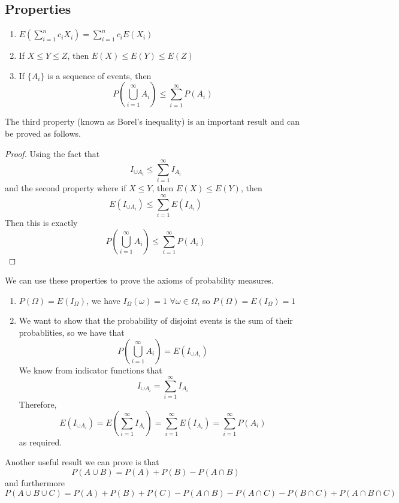 \subsection{Properties}
\begin{enumerate}
    \item $E\left(\sum\limits_{i=1}^n c_iX_i\right) = \sum\limits_{i=1}^n c_iE(X_i)$
    \item If $X \leq Y \leq Z$, then $E(X) \leq E(Y) \leq E(Z)$
    \item If $\{A_i\}$ is a sequence of events, then 
    \[P\left(\bigcup_{i=1}^\infty A_i\right) \leq \sum_{i=1}^\infty P(A_i)\]
   
\end{enumerate}
The third property (known as Borel's inequality) is an important result and can be proved as follows. 
\begin{proof}
    Using the fact that 
    \[I_{\cup A_i} \leq \sum_{i=1}^\infty I_{A_i}\]
    and the second property where if $X \leq Y$, then $E(X) \leq E(Y)$, then 
    \[E\left(I_{\cup A_i}\right) \leq \sum_{i=1}^\infty E(I_{A_i})\]
    Then this is exactly 
    \[P\left(\bigcup_{i=1}^\infty A_i\right) \leq \sum_{i=1}^\infty P(A_i)\]
\end{proof}
\noindent
We can use these properties to prove the axioms of probability measures. 
\begin{enumerate}
    \item $P(\Omega) = E(I_\Omega)$, we have $I_\Omega(\omega) = 1$ $\forall \omega \in \Omega$, so $P(\Omega) = E(I_\Omega) = 1$
    \item We want to show that the probability of disjoint events is the sum of their probablities, so we have that 
    \[P\left(\bigcup_{i=1}^\infty A_i\right) = E\left(I_{\cup A_i}\right)\]
    We know from indicator functions that 
    \[I_{\cup A_i} = \sum_{i=1}^\infty I_{A_i}\]
    Therefore,
    \[E\left(I_{\cup A_i}\right) = E\left(\sum_{i=1}^\infty I_{A_i}\right) = \sum_{i=1}^\infty E(I_{A_i}) = \sum_{i=1}^\infty P(A_i)\]
    as required. 
\end{enumerate}
Another useful result we can prove is that 
\[P(A \cup B) = P(A) + P(B) - P(A \cap B)\]
 and furthermore 
 \[P(A \cup B \cup C) = P(A) + P(B) + P(C) - P(A \cap B) - P(A \cap C) - P(B \cap C) + P(A \cap B \cap C)\]
